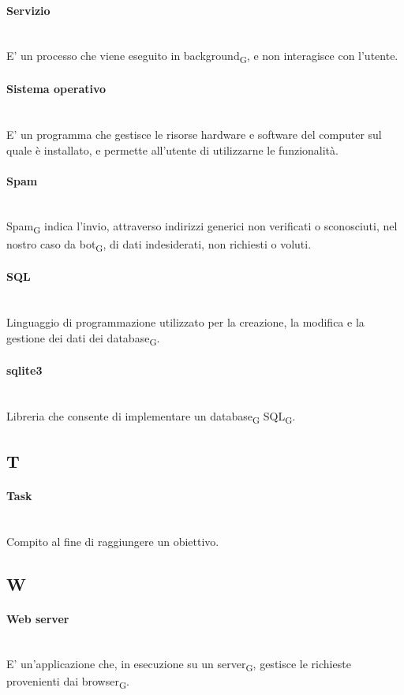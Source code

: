 \paragraph{Servizio}~\smallskip \\
E' un processo che viene eseguito in background\textsubscript{G}, e non interagisce con l'utente.

\paragraph{Sistema operativo}~\smallskip \\
E' un programma che gestisce le risorse hardware e software del computer sul quale è installato, e permette all'utente di utilizzarne le funzionalità.

\paragraph{Spam}~\smallskip \\
Spam\textsubscript{G} indica l'invio, attraverso indirizzi generici non verificati o sconosciuti, nel nostro caso da bot\textsubscript{G}, di dati indesiderati, non richiesti o voluti.

\paragraph{SQL}~\smallskip \\
Linguaggio di programmazione utilizzato per la creazione, la modifica e la gestione dei dati dei database\textsubscript{G}.

\paragraph{sqlite3}~\smallskip \\
Libreria che consente di implementare un database\textsubscript{G} SQL\textsubscript{G}.


\newpage
{}
\subsection*{T}
\paragraph{Task}~\smallskip \\
Compito al fine di raggiungere un obiettivo.

\newpage
{}
\subsection*{W}
\paragraph{Web server}~\smallskip \\
E' un'applicazione che, in esecuzione su un server\textsubscript{G}, gestisce le richieste provenienti dai browser\textsubscript{G}.

